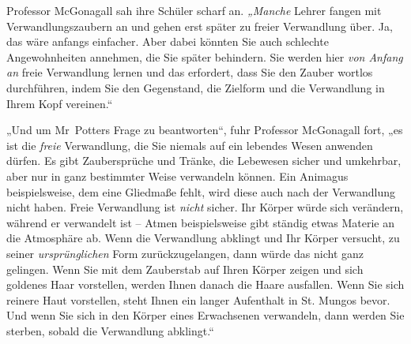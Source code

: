 Professor McGonagall sah ihre Schüler scharf an. \emph{„Manche} Lehrer fangen mit Verwandlungszaubern an und gehen erst später zu freier Verwandlung über. Ja, das wäre anfangs einfacher. Aber dabei könnten Sie auch schlechte Angewohnheiten annehmen, die Sie später behindern. Sie werden hier \emph{von Anfang an} freie Verwandlung lernen und das erfordert, dass Sie den Zauber wortlos durchführen, indem Sie den Gegenstand, die Zielform und die Verwandlung in Ihrem Kopf vereinen.“ 

„Und um Mr~Potters Frage zu beantworten“, fuhr Professor McGonagall fort, „es ist die \emph{freie} Verwandlung, die Sie niemals auf ein lebendes Wesen anwenden dürfen. Es gibt Zaubersprüche und Tränke, die Lebewesen sicher und umkehrbar, aber nur in ganz bestimmter Weise verwandeln können. Ein Animagus beispielsweise, dem eine Gliedmaße fehlt, wird diese auch nach der Verwandlung nicht haben. Freie Verwandlung ist \emph{nicht} sicher. Ihr Körper würde sich verändern, während er verwandelt ist – Atmen beispielsweise gibt ständig etwas Materie an die Atmosphäre ab. Wenn die Verwandlung abklingt und Ihr Körper versucht, zu seiner \emph{ursprünglichen} Form zurückzugelangen, dann würde das nicht ganz gelingen. Wenn Sie mit dem Zauberstab auf Ihren Körper zeigen und sich goldenes Haar vorstellen, werden Ihnen danach die Haare ausfallen. Wenn Sie sich reinere Haut vorstellen, steht Ihnen ein langer Aufenthalt in St. Mungos bevor. Und wenn Sie sich in den Körper eines Erwachsenen verwandeln, dann werden Sie sterben, sobald die Verwandlung abklingt.“ 

